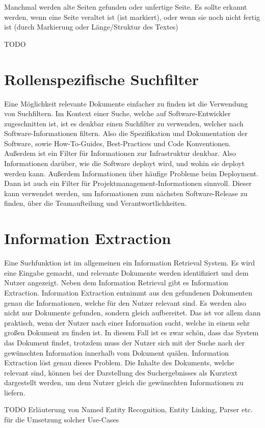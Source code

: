 Manchmal werden alte Seiten gefunden oder unfertige Seite.
Es sollte erkannt werden, wenn eine Seite veraltet ist (ist markiert), oder wenn sie noch nicht fertig ist (durch Markierung oder Länge/Struktur des Textes)

TODO

\section{Rollenspezifische Suchfilter}
\label{chap:rollenspezifische-suchfilter}
Eine Möglichkeit relevante Dokumente einfacher zu finden ist die Verwendung von Suchfiltern.
Im Kontext einer Suche, welche auf Software-Entwickler zugeschnitten ist, ist es denkbar einen Suchfilter zu verwenden, welcher nach Software-Informationen filtern.
Also die Spezifikation und Dokumentation der Software, sowie How-To-Guides, Best-Practices und Code Konventionen.
Außerdem ist ein Filter für Informationen zur Infrastruktur denkbar. Also Informationen darüber, wie die Software deployt wird, und wohin sie deployt werden kann.
Außerdem Informationen über häufige Probleme beim Deployment.
Dann ist auch ein Filter für Projektmanagement-Informationen sinnvoll.
Dieser kann verwendet werden, um Informationen zum nächsten Software-Release zu finden, über die Teamaufteilung und Verantwortlichkeiten.

\section{Information Extraction}
Eine Suchfunktion ist im allgemeinen ein Information Retrieval System.
Es wird eine Eingabe gemacht, und relevante Dokumente werden identifiziert und dem Nutzer angezeigt.
Neben dem Information Retrieval gibt es Information Extraction.
Information Extraction entnimmt aus den gefundenen Dokumenten genau die Informationen, welche für den Nutzer relevant sind.
Es werden also nicht nur Dokumente gefunden, sondern gleich aufbereitet.
Das ist vor allem dann praktisch, wenn der Nutzer nach einer Information sucht, welche in einem sehr großen Dokument zu finden ist.
In diesem Fall ist es zwar schön, dass das System das Dokument findet, trotzdem muss der Nutzer sich mit der Suche nach der gewünschten Information innerhalb vom Dokument quälen.
Information Extraction löst genau dieses Problem.
Die Inhalte des Dokuments, welche relevant sind, können bei der Darstellung des Suchergebnisses als Kurztext dargestellt werden, um dem Nutzer gleich die gewünschten Informationen zu liefern.

TODO Erläuterung von Named Entity Recognition, Entity Linking, Parser etc. für die Umsetzung solcher Use-Cases
